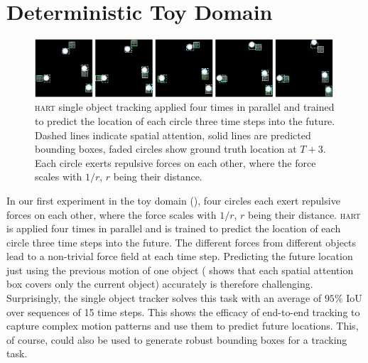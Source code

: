 \section{Deterministic Toy Domain}
\label{sec:appendix_toy}


\begin{figure}%
	\centering
	\includegraphics[width=0.99\textwidth]{figures/MOHART/sot_protons.png}
	\caption{
		\textsc{hart} single object tracking applied four times in parallel and trained to predict the location of each circle three time steps into the future. Dashed lines indicate spatial attention, solid lines are predicted bounding boxes, faded circles show ground truth location at $T+3$. Each circle exerts repulsive forces on each other, where the force scales with $1/r$, $r$ being their distance.
	}
	\label{fig:toy1}
\end{figure} 

In our first experiment in the toy domain (), four circles each exert repulsive forces on each other, where the force scales with $1/r$, $r$ being their distance. \textsc{hart} is applied four times in parallel and is trained to predict the location of each circle three time steps into the future. The different forces from different objects lead to a non-trivial force field at each time step. Predicting the future location just using the previous motion of one object ( shows that each spatial attention box covers only the current object) accurately is therefore challenging. Surprisingly, the single object tracker solves this task with an average of $95\%$ IoU over sequences of 15 time steps. This shows the efficacy of end-to-end tracking to capture complex motion patterns and use them to predict future locations. This, of course, could also be used to generate robust bounding boxes for a tracking task.
